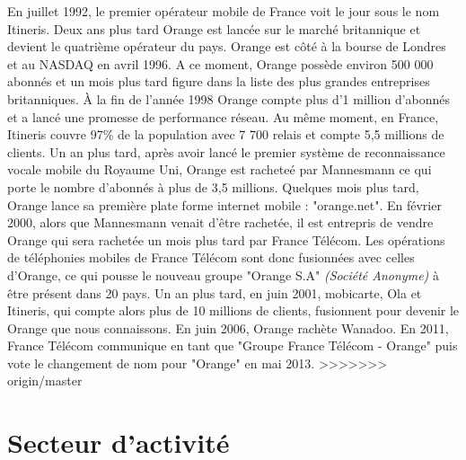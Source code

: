 En juillet 1992, le premier opérateur mobile  de France voit le jour sous le nom Itineris. Deux ans plus tard Orange est lancée sur le marché britannique et devient le quatrième opérateur du pays. Orange est côté à la bourse de Londres et au NASDAQ en avril 1996. A ce moment, Orange possède environ 500 000 abonnés et un mois plus tard figure dans la liste des plus grandes entreprises britanniques. À la fin de l'année 1998 Orange compte plus d'1 million d'abonnés et a lancé une promesse de performance réseau. Au même moment, en France, Itineris couvre 97\% de la population avec 7 700 relais et compte 5,5 millions de clients. Un an plus tard, après avoir lancé le premier système de reconnaissance vocale mobile du Royaume Uni, Orange est racheteé par Mannesmann ce qui porte le nombre d'abonnés à plus de 3,5 millions. Quelques mois plus tard, Orange lance sa première plate forme internet mobile : "orange.net". En février 2000, alors que Mannesmann venait d'être rachetée, il est entrepris de vendre Orange qui sera rachetée un mois plus tard par France Télécom. Les opérations de téléphonies mobiles de France Télécom sont donc fusionnées avec celles d'Orange, ce qui pousse le nouveau groupe "Orange S.A" \textit{(Société Anonyme)} à être présent dans 20 pays. Un an plus tard, en juin 2001, mobicarte, Ola et Itineris, qui compte alors plus de 10 millions de clients, fusionnent pour devenir le Orange que nous connaissons. En juin 2006, Orange rachète Wanadoo. En 2011, France Télécom communique en tant que "Groupe France Télécom - Orange" puis vote le changement de nom pour "Orange" en mai 2013.
>>>>>>> origin/master



\section{Secteur d'activité}

